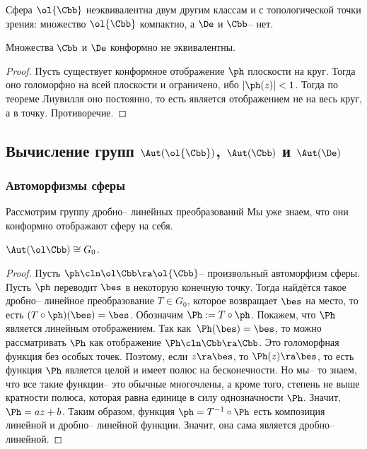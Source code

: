 \documentclass[a4paper]{article}
\begin{document}
\begin{note}
Сфера $\ol{\Cbb}$ неэквивалентна двум другим классам и с топологической точки зрения:
множество $\ol{\Cbb}$ компактно, а $\De$ и $\Cbb$-- нет.
\end{note}

\begin{stm}
Множества $\Cbb$ и $\De$ конформно не эквивалентны.
\end{stm}
\begin{proof}
Пусть существует конформное отображение $\ph$ плоскости на круг. Тогда оно голоморфно на всей плоскости и ограничено,
ибо $|\ph(z)|<1$. Тогда по теореме Лиувилля оно постоянно, то есть является отображением не на весь круг, а в точку.
Противоречие.
\end{proof}

\subsection{Вычисление групп $\Aut(\ol{\Cbb})$, $\Aut(\Cbb)$ и $\Aut(\De)$}

\subsubsection{Автоморфизмы сферы}

Рассмотрим группу дробно-- линейных преобразований
Мы уже знаем, что они конформно отображают сферу на себя.

\begin{theorem}
$\Aut(\ol\Cbb) \cong G_0$.
\end{theorem}
\begin{proof}
Пусть $\ph\cln\ol\Cbb\ra\ol{\Cbb}$-- произвольный автоморфизм сферы. Пусть $\ph$ переводит $\bes$
в некоторую конечную точку. Тогда найдётся такое дробно-- линейное преобразование $T \in G_0$, которое возвращает $\bes$
на место, то есть $(T\circ \ph)(\bes)=\bes$. Обозначим $\Ph := T \circ \ph$. Покажем, что $\Ph$ является линейным
отображением. Так как~$\Ph(\bes)=\bes$, то можно рассматривать $\Ph$ как отображение $\Ph\cln\Cbb\ra \Cbb$.
Это голоморфная функция без особых точек. Поэтому, если $z\ra\bes$, то $\Ph(z)\ra\bes$, то есть функция $\Ph$ является
целой и имеет полюс на бесконечности. Но мы-- то знаем, что все такие функции-- это обычные многочлены, а кроме того,
степень не выше кратности полюса, которая равна единице в силу однозначности $\Ph$. Значит, $\Ph = az+b$.
Таким образом, функция $\ph = T^{-1}\circ \Ph$ есть композиция линейной и дробно-- линейной функции. Значит, она сама
является дробно-- линейной.
\end{proof}
\end{document}
